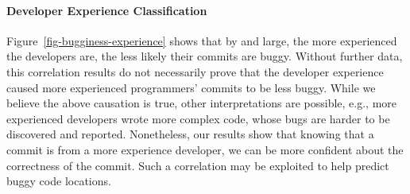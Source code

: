\paragraph{Developer Experience Classification}

Figure~\ref{fig-bugginess-experience} %
shows that by and large, the more experienced the developers are, the less likely their commits are buggy.
Without further data, this correlation results do not necessarily prove that the developer experience caused more 
experienced programmers' commits to be less buggy. 
While we believe the above causation is true, other interpretations are possible, e.g., more experienced developers wrote 
more complex code, whose bugs are harder to be discovered and reported. 
Nonetheless, our results show that knowing that a commit is from a more experience developer, we can 
be more confident about the correctness of the commit. Such a correlation may be exploited 
to help predict buggy code locations.




